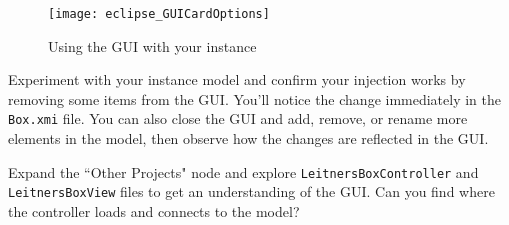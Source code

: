 \begin{stepbystep}
\vspace{1cm}

\begin{figure}[htbp]
    \centering
    \texttt{[image: eclipse\_GUICardOptions]}
    \caption{Using the GUI with your instance}
    \label{eclipse:GUI_cardOptions}
\end{figure}

\vspace{1cm}

\item Experiment with your instance model and confirm your injection works by removing some items from the GUI.  You'll notice the change
immediately in the \texttt{Box.xmi} file. You can also close the GUI and add, remove, or rename more elements in the model, then observe how the changes are
reflected in the GUI.

\vspace{0.5cm}

\item Expand the ``Other Projects" node and explore \texttt{LeitnersBoxController} and \texttt{LeitnersBoxView} files to get an
understanding of the GUI. Can you find where the controller loads and connects to the model?

\end{stepbystep}
